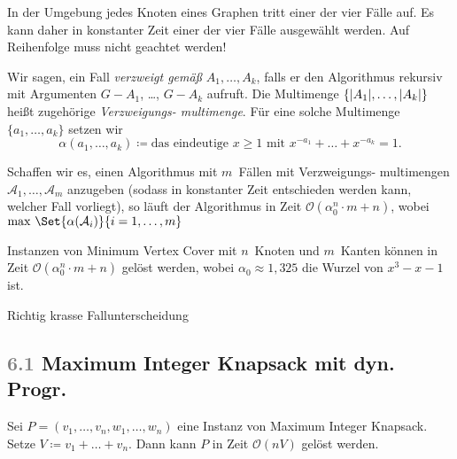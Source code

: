 \documentclass{cheat-sheet}
\newcommand{\size}[1]{\abs{#1}} %
\renewcommand{\O}{\mathcal{O}} %
\newcommand{\Problem}[1]{\textcolor{ProblemColor}{\textbf{#1}}}
\newcommand{\scriptSection}[1]{\textcolor{gray}{#1}\enspace}
\begin{document}
\begin{samepage}

\begin{bem}
  In der Umgebung jedes Knoten eines Graphen tritt einer der vier Fälle auf.
  Es kann daher in konstanter Zeit einer der vier Fälle ausgewählt werden.
  Auf Reihenfolge muss nicht geachtet werden!
\end{bem}

Wir sagen, ein Fall \textit{verzweigt gemäß} $A_1, \ldots, A_k$, falls er den Algorithmus rekursiv mit Argumenten $G - A_1$, \ldots, $G - A_k$ aufruft.
Die Multimenge $\{ \size{A_1}, \ldots, \size{A_k} \}$ heißt zugehörige \textit{Verzweigungs- multimenge}.
Für eine solche Multimenge $\{ a_1, \ldots, a_k \}$ setzen wir
\[ \alpha(a_1, \ldots, a_k) \coloneqq \text{das eindeutige $x \geq 1$ mit } x^{-a_1} + \ldots + x^{-a_k} = 1. \]

\end{samepage}

Schaffen wir es, einen Algorithmus mit $m$~Fällen mit Verzweigungs- multimengen $\mathcal{A}_1, \ldots, \mathcal{A}_m$ anzugeben (sodass in konstanter Zeit entschieden werden kann, welcher Fall vorliegt), so läuft der Algorithmus in Zeit $\O(\alpha_0^n \cdot m + n)$, wobei $\max \, \Set{\alpha(\mathcal{A}_i)}{i = 1, \ldots, m}$

\begin{satz}
  Instanzen von Minimum Vertex Cover mit $n$~Knoten und $m$~Kanten können in Zeit $\O(\alpha_0^n \cdot m + n)$ gelöst werden, wobei $\alpha_0 \approx 1,325$ die Wurzel von $x^3 - x - 1$ ist.
\end{satz}

\begin{beweisidee}
  Richtig krasse Fallunterscheidung
\end{beweisidee}


\subsection{\scriptSection{6.1} \Problem{Maximum Integer Knapsack} mit dyn. Progr.}

\begin{satz}
  Sei $P = (v_1, \ldots, v_n, w_1, \ldots, w_n)$ eine Instanz von Maximum Integer Knapsack.
  Setze $V \coloneqq v_1 + \ldots + v_n$.
  Dann kann $P$ in Zeit $\O(n V)$ gelöst werden.
\end{satz}
\end{document}
